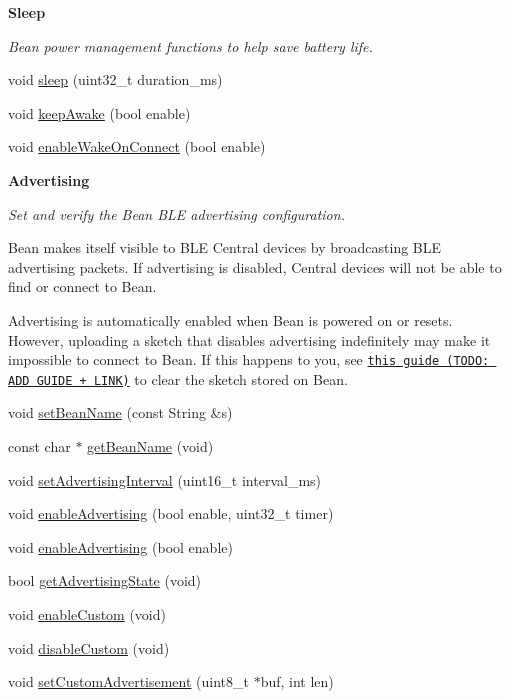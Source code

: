 \begin{Indent}{\bf Sleep}\par
{\em Bean power management functions to help save battery life. }\begin{DoxyCompactItemize}
\item 
void \hyperlink{class_bean_class_a15d6716d0bdc66a0345acc29d0c14a14}{sleep} (uint32\+\_\+t duration\+\_\+ms)
\item 
void \hyperlink{class_bean_class_abbd5ae43b98270dfc94b98b2ecd66281}{keep\+Awake} (bool enable)
\item 
void \hyperlink{class_bean_class_a639e425394c820a99025d136dddd3369}{enable\+Wake\+On\+Connect} (bool enable)
\end{DoxyCompactItemize}
\end{Indent}
\begin{Indent}{\bf Advertising}\par
{\em Set and verify the Bean B\+L\+E advertising configuration.

Bean makes itself visible to B\+L\+E Central devices by broadcasting B\+L\+E advertising packets. If advertising is disabled, Central devices will not be able to find or connect to Bean.

Advertising is automatically enabled when Bean is powered on or resets. However, uploading a sketch that disables advertising indefinitely may make it impossible to connect to Bean. If this happens to you, see \href{#}{\tt this guide (T\+O\+D\+O\+: A\+D\+D G\+U\+I\+D\+E + L\+I\+N\+K)} to clear the sketch stored on Bean. }\begin{DoxyCompactItemize}
\item 
void \hyperlink{class_bean_class_a32c0dc702c367caf274b72ba4a4cb8a2}{set\+Bean\+Name} (const String \&s)
\item 
const char $\ast$ \hyperlink{class_bean_class_a5b50d48ce0b6ccb3f267d1d7ba660dd3}{get\+Bean\+Name} (void)
\item 
void \hyperlink{class_bean_class_a41412684c0f01f06f260fb1e724475d9}{set\+Advertising\+Interval} (uint16\+\_\+t interval\+\_\+ms)
\item 
void \hyperlink{class_bean_class_a9bff2d903c4a543ba48f0ac1b392c7cc}{enable\+Advertising} (bool enable, uint32\+\_\+t timer)
\item 
void \hyperlink{class_bean_class_ade5d4c6a061eeb6d7897ef4c3b2c26d3}{enable\+Advertising} (bool enable)
\item 
bool \hyperlink{class_bean_class_a099bbffcf98e71f533f8277ec5274785}{get\+Advertising\+State} (void)
\item 
void \hyperlink{class_bean_class_a9bbcf8d6db2a229d12838b2626e514d0}{enable\+Custom} (void)
\item 
void \hyperlink{class_bean_class_a02201abea93983434dec1025c4957e83}{disable\+Custom} (void)
\item 
void \hyperlink{class_bean_class_add3cfcf31fe80a72bf6e4cf2cdaf99bb}{set\+Custom\+Advertisement} (uint8\+\_\+t $\ast$buf, int len)
\end{DoxyCompactItemize}
\end{Indent}
